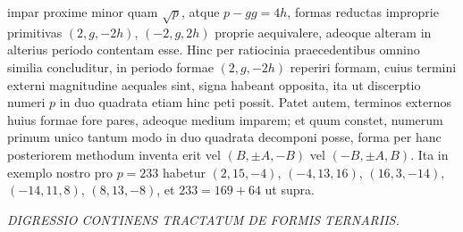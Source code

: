 impar proxime minor quam $\surd p$, atque $p-gg=4h$, formas reductas improprie
primitivas $(2, g, -2h)$, $(-2, g, 2h)$ proprie aequivalere, adeoque alteram
in alterius periodo contentam esse. Hinc per ratiocinia praecedentibus omnino
similia concluditur, in periodo formae $(2, g, -2h)$ reperiri formam, cuius termini
externi magnitudine aequales sint, signa habeant opposita, ita ut discerptio
numeri $p$ in duo quadrata etiam hinc peti possit. Patet autem, terminos externos
huius formae fore pares, adeoque medium imparem; et quum constet, numerum
primum unico tantum modo in duo quadrata decomponi posse, forma per
hanc posteriorem methodum inventa erit vel $(B, \pm A, -B)$ vel $(-B, \pm A, B)$.
Ita in exemplo nostro pro $p=233$ habetur $(2, 15, -4)$, $(-4, 13, 16)$, $(16, 3, -14)$,
$(-14, 11, 8)$, $(8, 13, -8)$, et $233=169+64$ ut supra.

\begin{center}
\textit{DIGRESSIO CONTINENS TRACTATUM DE FORMIS TERNARIIS.}
\end{center}

